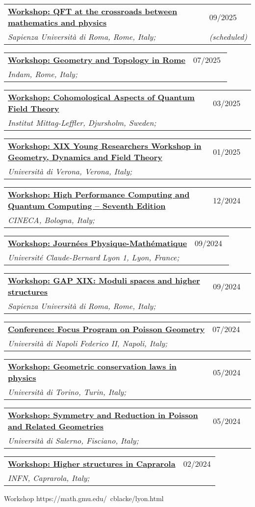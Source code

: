\documentclass[a4paper]{article}
\newcommand{\longvoice}[8]{
	\begin{tabular}{p{0.83\linewidth} p{0.17\linewidth} }
		\textbf{\href{#3}{#2: #1}} & #4 
		\\ 
		\textit{#5, #6, #7;} & {\small\emph{#8}}
	\end{tabular}
	\vspace{.5em}
}
\begin{document}
    \longvoice{QFT at the crossroads between mathematics and physics}
        {Workshop}
        {https://sites.google.com/view/qft-at-the-crossroads/home?authuser=0}
        {09/2025}
        {Sapienza Università di Roma}
        {Rome}
        {Italy}
        {(scheduled)}
    \longvoice{Geometry and Topology in Rome}
        {Workshop}
        {https://www.mat.uniroma2.it/~kowalzig/ws.html}
        {07/2025}
        {Indam}
        {Rome}
        {Italy}
        {}	
	\longvoice{Cohomological Aspects of Quantum Field Theory}
		{Workshop}
		{https://www.mittag-leffler.se/activities/cohomological-aspects-of-quantum-field-theory/}
		{03/2025}
		{Institut Mittag-Leffler}
		{Djursholm}
		{Sweden}
		{}
	\longvoice{XIX Young Researchers Workshop in Geometry, Dynamics and Field Theory}
		{Workshop}
		{https://sites.google.com/view/xix-yrw-verona/program?authuser=0}
		{01/2025}
		{Università di Verona}
		{Verona}
		{Italy}
		{}
	\longvoice{High Performance Computing and Quantum Computing – Seventh Edition}
		{Workshop}
		{https://eventi.cineca.it/en/hpc/high-performance-computing-and-quantum-computing-seventh-edition/bologna-20241212}
		{12/2024}
		{CINECA}
		{Bologna}
		{Italy}
		{}
	\longvoice{Journées Physique-Mathématique}
		{Workshop}
		{https://indico.math.cnrs.fr/event/12743/overview}
		{09/2024}
		{Université Claude-Bernard Lyon 1}
		{Lyon}
		{France}
		{}
	\longvoice{GAP XIX: Moduli spaces and higher structures}
		{Workshop}
		{https://www1.mat.uniroma1.it/~fiorenza/GAP-Rome/GAP-XIX-2024-Rome.html}
		{09/2024}
		{Sapienza Università di Roma}
		{Rome}
		{Italy}
		{}
	\longvoice{Focus Program on Poisson Geometry}
		{Conference}
		{https://sites.google.com/view/poisson2024/poisson-2024?authuser=0}
		{07/2024}
		{Università di Napoli Federico II}
		{Napoli}
		{Italy}
		{}
	\longvoice{Geometric conservation laws in physics}
		{Workshop}
		{https://www.dropbox.com/scl/fi/j54tl4m10fl2scbrtc4sx/2405-Torino-Conservationlaws.pdf?rlkey=ay7nrxda4fg8lklvox578g6yj\&st=9t3jx47r\&dl=0}
		{05/2024}
		{Università di Torino}
		{Turin}
		{Italy}
		{}
	\longvoice{Symmetry and Reduction in Poisson and Related Geometries}
		{Workshop}
		{https://sites.google.com/view/poisson2024/seminars-workshops/symmetry-reduction?authuser=0}
		{05/2024}
		{Università di Salerno}
		{Fisciano}
		{Italy}
		{}
	\longvoice{Higher structures in Caprarola}
		{Workshop}
		{http://wpage.unina.it/francesco.dandrea/Caprarola2024/index.html}
		{02/2024}
		{INFN}
		{Caprarola}
		{Italy}
		{}
		{Workshop}
		{https://math.gmu.edu/~cblacke/lyon.html}
\end{document}
